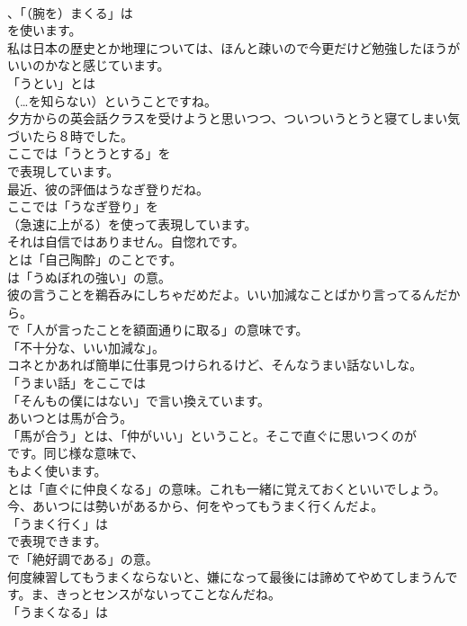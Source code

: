 \documentclass[8pt]{extreport}
\begin{document}
\begin{CJK}{UTF8}{min}
\\	、「（腕を）まくる」は
\\	を使います。	
\\	私は日本の歴史とか地理については、ほんと疎いので今更だけど勉強したほうがいいのかなと感じています。 
\\	「うとい」とは 
\\	（…を知らない）ということですね。	
\\	夕方からの英会話クラスを受けようと思いつつ、ついついうとうと寝てしまい気づいたら８時でした。 
\\	ここでは「うとうとする」を 
\\	で表現しています。	
\\	最近、彼の評価はうなぎ登りだね。 
\\	ここでは「うなぎ登り」を
\\	（急速に上がる）を使って表現しています。	
\\	それは自信ではありません。自惚れです。 
\\	とは「自己陶酔」のことです。
\\	は「うぬぼれの強い」の意。	
\\	彼の言うことを鵜呑みにしちゃだめだよ。いい加減なことばかり言ってるんだから。 
\\	で「人が言ったことを額面通りに取る」の意味です。
\\	「不十分な、いい加減な」。	
\\	コネとかあれば簡単に仕事見つけられるけど、そんなうまい話ないしな。 
\\	「うまい話」をここでは
\\	「そんもの僕にはない」で言い換えています。	
\\	あいつとは馬が合う。 
\\	「馬が合う」とは、「仲がいい」ということ。そこで直ぐに思いつくのが
\\	です。同じ様な意味で、
\\	もよく使います。
\\	とは「直ぐに仲良くなる」の意味。これも一緒に覚えておくといいでしょう。	
\\	今、あいつには勢いがあるから、何をやってもうまく行くんだよ。 
\\	「うまく行く」は
\\	で表現できます。
\\	で「絶好調である」の意。	
\\	何度練習してもうまくならないと、嫌になって最後には諦めてやめてしまうんです。ま、きっとセンスがないってことなんだね。 
\\	「うまくなる」は 

\end{CJK}
\end{document}
